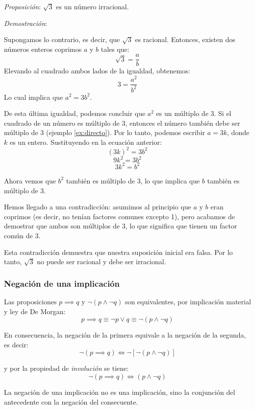 \begin{fmd-example}
\textit{Proposición}: $\sqrt{3}$ es un número irracional.

\textit{Demostración}:

Supongamos lo contrario, es decir, que $\sqrt{3}$ es racional. Entonces, existen dos números enteros coprimos $a$ y $b$ tales que:
$$\sqrt{3} = \frac{a}{b}$$
Elevando al cuadrado ambos lados de la igualdad, obtenemos:
$$3 = \frac{a^2}{b^2}$$
Lo cual implica que $a^2 = 3b^2$.

De esta última igualdad, podemos concluir que $a^2$ es un múltiplo de 3. Si el cuadrado de un número es múltiplo de 3, entonces el número también debe ser múltiplo de 3 (ejemplo \ref{ex:directo}). Por lo tanto, podemos escribir $a = 3k$, donde $k$ es un entero. Sustituyendo en la ecuación anterior:
$$(3k)^2 = 3b^2$$
$$9k^2 = 3b^2$$
$$3k^2 = b^2$$

Ahora vemos que $b^2$ también es múltiplo de 3, lo que implica que $b$ también es múltiplo de 3.

Hemos llegado a una contradicción: asumimos al principio que $a$ y $b$ eran coprimos (es decir, no tenían factores comunes excepto 1), pero acabamos de demostrar que ambos son múltiplos de 3, lo que significa que tienen un factor común de 3. 

Esta contradicción demuestra que nuestra suposición inicial era falsa. Por lo tanto, $\sqrt{3}$ no puede ser racional y debe ser irracional.
\end{fmd-example}

\subsubsection{Negación de una implicación} 
Las proposiciones $p \implies q$ y $\neg (p \land \neg q)$ son equivalentes, por implicación material y ley de De Morgan:
\[ p \implies q \equiv \neg p \lor q \equiv \neg \left( p \land \neg q \right) \]

En consecuencia, la negación de la primera equivale a la negación de la segunda, es decir:
\[ \neg (p \implies q) \iff \neg [ \neg (p \land \neg q)] \]

y por la propiedad de \textit{involución} se tiene:
\[ \boxed{\neg (p \implies q) \iff (p \land \neg q)} \]

La negación de una implicación no es una implicación, sino la conjunción del antecedente con la negación del consecuente.

